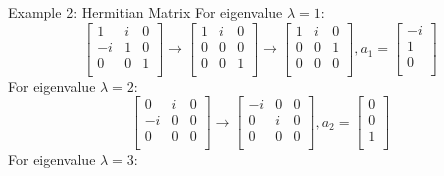 \documentclass{beamer}
\begin{document}
\begin{frame}{Example 2: Hermitian Matrix}
For eigenvalue $\lambda=1$:
\begin{equation*}
    \left[ \begin{matrix}
        1&		i&		0\\
        -i&		1&		0\\
        0&		0&		1\\
    \end{matrix} \right] \rightarrow \left[ \begin{matrix}
        1&		i&		0\\
        0&		0&		0\\
        0&		0&		1\\
    \end{matrix} \right] \rightarrow \left[ \begin{matrix}
        1&		i&		0\\
        0&		0&		1\\
        0&		0&		0\\
    \end{matrix} \right] , a_1=\left[ \begin{array}{c}
        -i\\
        1\\
        0\\
    \end{array} \right]
\end{equation*}
For eigenvalue $\lambda=2$:
\begin{equation*}
    \left[ \begin{matrix}
        0&		i&		0\\
        -i&		0&		0\\
        0&		0&		0\\
    \end{matrix} \right] \rightarrow \left[ \begin{matrix}
        -i&		0&		0\\
        0&		i&		0\\
        0&		0&		0\\
    \end{matrix} \right]  , a_2=\left[ \begin{array}{c}
        0\\
        0\\
        1\\
    \end{array} \right]
\end{equation*}
For eigenvalue $\lambda=3$:
\begin{equation*}

\end{equation*}
\end{frame}
\end{document}
